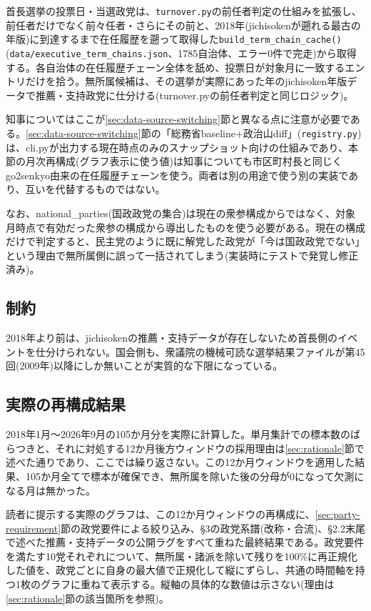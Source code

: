 \documentclass[a4paper,11pt]{ltjsarticle}
\begin{document}
首長選挙の投票日・当選政党は、\texttt{turnover.py}の前任者判定の仕組みを拡張し、前任者だけでなく前々任者・さらにその前と、2018年(jichisokenが遡れる最古の年版)に到達するまで在任履歴を遡って取得した\texttt{build\_term\_chain\_cache()}(\texttt{data/executive\_term\_chains.json}、1785自治体、エラー0件で完走)から取得する。各自治体の在任履歴チェーン全体を舐め、投票日が対象月に一致するエントリだけを拾う。無所属候補は、その選挙が実際にあった年のjichisoken年版データで推薦・支持政党に仕分ける(turnover.pyの前任者判定と同じロジック)。

知事についてはここが\ref{sec:data-source-switching}節と異なる点に注意が必要である。\ref{sec:data-source-switching}節の「総務省baseline+政治山diff」(\texttt{registry.py})は、cli.pyが出力する現在時点のみのスナップショット向けの仕組みであり、本節の月次再構成(グラフ表示に使う値)は知事についても市区町村長と同じくgo2senkyo由来の在任履歴チェーンを使う。両者は別の用途で使う別の実装であり、互いを代替するものではない。

なお、national\_parties(国政政党の集合)は現在の衆参構成からではなく、対象月時点で有効だった衆参の構成から導出したものを使う必要がある。現在の構成だけで判定すると、民主党のように既に解党した政党が「今は国政政党でない」という理由で無所属側に誤って一括されてしまう(実装時にテストで発覚し修正済み)。

\subsection{制約}

2018年より前は、jichisokenの推薦・支持データが存在しないため首長側のイベントを仕分けられない。国会側も、衆議院の機械可読な選挙結果ファイルが第45回(2009年)以降にしか無いことが実質的な下限になっている。

\subsection{実際の再構成結果}

2018年1月〜2026年9月の105か月分を実際に計算した。単月集計での標本数のばらつきと、それに対処する12か月後方ウィンドウの採用理由は\ref{sec:rationale}節で述べた通りであり、ここでは繰り返さない。この12か月ウィンドウを適用した結果、105か月全てで標本が確保でき、無所属を除いた後の分母が0になって欠測になる月は無かった。

読者に提示する実際のグラフは、この12か月ウィンドウの再構成に、\ref{sec:party-requirement}節の政党要件による絞り込み、\S3の政党系譜(改称・合流)、\S2.2末尾で述べた推薦・支持データの公開ラグをすべて重ねた最終結果である。政党要件を満たす10党それぞれについて、無所属・諸派を除いて残りを100\%に再正規化した値を、政党ごとに自身の最大値で正規化して縦にずらし、共通の時間軸を持つ1枚のグラフに重ねて表示する。縦軸の具体的な数値は示さない(理由は\ref{sec:rationale}節の該当箇所を参照)。
\end{document}
